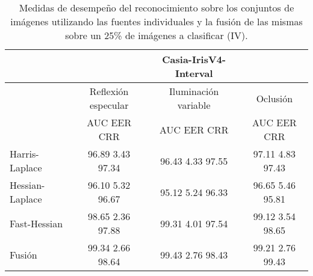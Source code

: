 \begin{table}[h]
\begin{center}
\begin{tabular}{@{}lccc@{}}
\toprule
&& Casia-IrisV4-Interval & \\ \hline
&Reflexión especular		&  	Iluminación variable		& Oclusión \\ \hline
&AUC  \phantom{aa} EER  \phantom{aa} CRR &  	AUC  \phantom{aa} EER  \phantom{aa} CRR		& AUC  \phantom{aa} EER  \phantom{aa} CRR \\ \hline
Harris-Laplace& 96.89 \phantom{aa} 3.43  \phantom{aa} 97.34 &  	96.43 \phantom{aa} 4.33  \phantom{aa}97.55		& 97.11 \phantom{aa} 4.83 \phantom{aa} 97.43 \\
Hessian-Laplace& 96.10 \phantom{aa} 5.32  \phantom{aa} 96.67 &  	95.12 \phantom{aa} 5.24 \phantom{aa} 96.33 & 96.65 \phantom{aa} 5.46 \phantom{aa} 95.81\\
Fast-Hessian& 98.65  \phantom{aa}2.36 \phantom{aa}  97.88 &  	99.31 \phantom{aa} 4.01 \phantom{aa}97.54		& 99.12  \phantom{aa}3.54 \phantom{aa} 98.65 \\
Fusión& 99.34 \phantom{aa} 2.66  \phantom{aa}98.64 &  	99.43  \phantom{aa}2.76 \phantom{aa} 98.43		& 99.21 \phantom{aa} 2.76  \phantom{aa}99.43 \\ \hline

\end{tabular}
\end{center}
\caption{Medidas de desempeño del reconocimiento sobre los conjuntos de imágenes utilizando las fuentes individuales y la fusión de las mismas sobre un 25\% de imágenes a clasificar (IV).}
\label{my_tabla}
\end{table}

